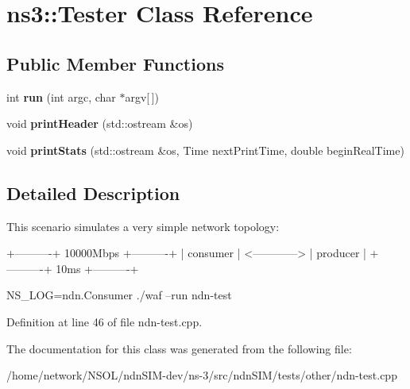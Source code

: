 \hypertarget{classns3_1_1Tester}{}\section{ns3\+:\+:Tester Class Reference}
\label{classns3_1_1Tester}
\subsection*{Public Member Functions}
\begin{DoxyCompactItemize}
\item 
int {\bfseries run} (int argc, char $\ast$argv\mbox{[}$\,$\mbox{]})\hypertarget{classns3_1_1Tester_a4ffe5f723e9d7b0ff2ea89fe3c702e20}{}\label{classns3_1_1Tester_a4ffe5f723e9d7b0ff2ea89fe3c702e20}

\item 
void {\bfseries print\+Header} (std\+::ostream \&os)\hypertarget{classns3_1_1Tester_a5e7d1b775f60a412ad38bd1a5e92f3de}{}\label{classns3_1_1Tester_a5e7d1b775f60a412ad38bd1a5e92f3de}

\item 
void {\bfseries print\+Stats} (std\+::ostream \&os, Time next\+Print\+Time, double begin\+Real\+Time)\hypertarget{classns3_1_1Tester_ab6219b4405b893feed24505885de4d6f}{}\label{classns3_1_1Tester_ab6219b4405b893feed24505885de4d6f}

\end{DoxyCompactItemize}


\subsection{Detailed Description}
This scenario simulates a very simple network topology\+:

\begin{DoxyVerb} +----------+     10000Mbps   +----------+
 | consumer |  <------------> | producer |
 +----------+       10ms      +----------+


NS_LOG=ndn.Consumer ./waf --run ndn-test\end{DoxyVerb}
 

Definition at line 46 of file ndn-\/test.\+cpp.



The documentation for this class was generated from the following file\+:\begin{DoxyCompactItemize}
\item 
/home/network/\+N\+S\+O\+L/ndn\+S\+I\+M-\/dev/ns-\/3/src/ndn\+S\+I\+M/tests/other/ndn-\/test.\+cpp\end{DoxyCompactItemize}

